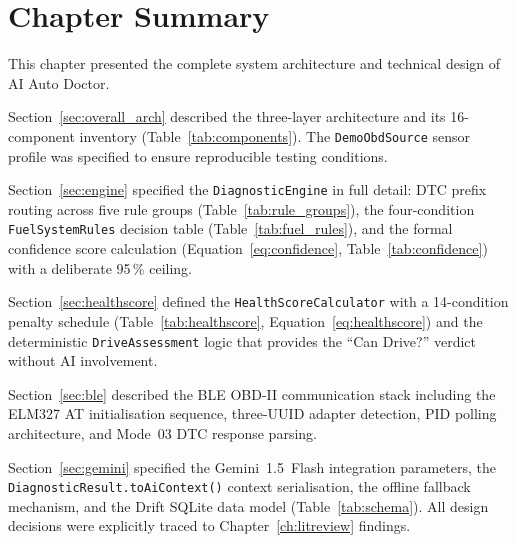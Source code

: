 \section{Chapter Summary}
\label{sec:ch2summary}

This chapter presented the complete system architecture and technical design of AI Auto Doctor.

Section~\ref{sec:overall_arch} described the three-layer architecture and its 16-component inventory (Table~\ref{tab:components}).
The \texttt{DemoObdSource} sensor profile was specified to ensure reproducible testing conditions.

Section~\ref{sec:engine} specified the \texttt{DiagnosticEngine} in full detail: DTC prefix routing across five rule groups (Table~\ref{tab:rule_groups}), the four-condition \texttt{FuelSystemRules} decision table (Table~\ref{tab:fuel_rules}), and the formal confidence score calculation (Equation~\ref{eq:confidence}, Table~\ref{tab:confidence}) with a deliberate 95\,\% ceiling.

Section~\ref{sec:healthscore} defined the \texttt{HealthScoreCalculator} with a 14-condition penalty schedule (Table~\ref{tab:healthscore}, Equation~\ref{eq:healthscore}) and the deterministic \texttt{DriveAssessment} logic that provides the ``Can Drive?'' verdict without AI involvement.

Section~\ref{sec:ble} described the BLE OBD-II communication stack including the ELM327 AT initialisation sequence, three-UUID adapter detection, PID polling architecture, and Mode~03 DTC response parsing.

Section~\ref{sec:gemini} specified the Gemini~1.5~Flash integration parameters, the \texttt{DiagnosticResult.toAiContext()} context serialisation, the offline fallback mechanism, and the Drift SQLite data model (Table~\ref{tab:schema}).
All design decisions were explicitly traced to Chapter~\ref{ch:litreview} findings.

\clearpage
